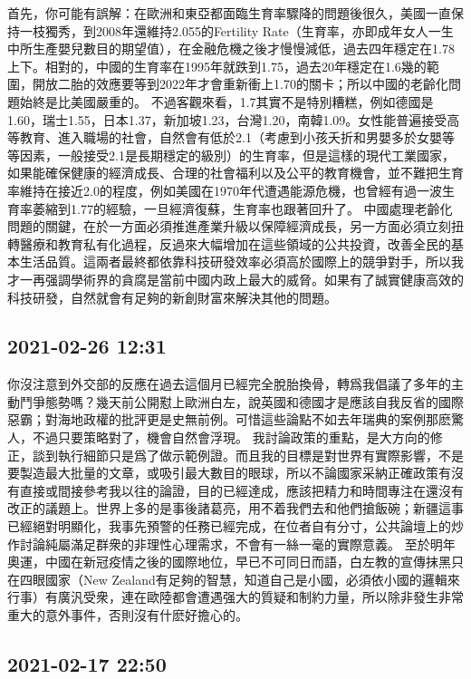 \documentclass[twocolumn]{ctexart}
\begin{document}
首先，你可能有誤解：在歐洲和東亞都面臨生育率驟降的問題後很久，美國一直保持一枝獨秀，到2008年還維持2.055的Fertility Rate（生育率，亦即成年女人一生中所生產嬰兒數目的期望值），在金融危機之後才慢慢減低，過去四年穩定在1.78上下。相對的，中國的生育率在1995年就跌到1.75，過去20年穩定在1.6幾的範圍，開放二胎的效應要等到2022年才會重新衝上1.70的關卡；所以中國的老齡化問題始終是比美國嚴重的。
不過客觀來看，1.7其實不是特別糟糕，例如德國是1.60，瑞士1.55，日本1.37，新加坡1.23，台灣1.20，南韓1.09。女性能普遍接受高等教育、進入職場的社會，自然會有低於2.1（考慮到小孩夭折和男嬰多於女嬰等等因素，一般接受2.1是長期穩定的級別）的生育率，但是這樣的現代工業國家，如果能確保健康的經濟成長、合理的社會福利以及公平的教育機會，並不難把生育率維持在接近2.0的程度，例如美國在1970年代遭遇能源危機，也曾經有過一波生育率萎縮到1.77的經驗，一旦經濟復蘇，生育率也跟著回升了。
中國處理老齡化問題的關鍵，在於一方面必須推進產業升級以保障經濟成長，另一方面必須立刻扭轉醫療和教育私有化過程，反過來大幅增加在這些領域的公共投資，改善全民的基本生活品質。這兩者最終都依靠科技研發效率必須高於國際上的競爭對手，所以我才一再强調學術界的貪腐是當前中國内政上最大的威脅。如果有了誠實健康高效的科技研發，自然就會有足夠的新創財富來解決其他的問題。
\subsection*{2021-02-26 12:31}

你沒注意到外交部的反應在過去這個月已經完全脫胎換骨，轉爲我倡議了多年的主動鬥爭態勢嗎？幾天前公開懟上歐洲白左，說英國和德國才是應該自我反省的國際惡霸；對海地政權的批評更是史無前例。可惜這些論點不如去年瑞典的案例那麽驚人，不過只要策略對了，機會自然會浮現。
我討論政策的重點，是大方向的修正，談到執行細節只是爲了做示範例證。而且我的目標是對世界有實際影響，不是要製造最大批量的文章，或吸引最大數目的眼球，所以不論國家采納正確政策有沒有直接或間接參考我以往的論證，目的已經達成，應該把精力和時間專注在還沒有改正的議題上。世界上多的是事後諸葛亮，用不着我們去和他們搶飯碗；新疆這事已經絕對明顯化，我事先預警的任務已經完成，在位者自有分寸，公共論壇上的炒作討論純屬滿足群衆的非理性心理需求，不會有一絲一毫的實際意義。
至於明年奧運，中國在新冠疫情之後的國際地位，早已不可同日而語，白左教的宣傳抹黑只在四眼國家（New Zealand有足夠的智慧，知道自己是小國，必須依小國的邏輯來行事）有廣汎受衆，連在歐陸都會遭遇强大的質疑和制約力量，所以除非發生非常重大的意外事件，否則沒有什麽好擔心的。
\subsection*{2021-02-17 22:50}
\end{document}
